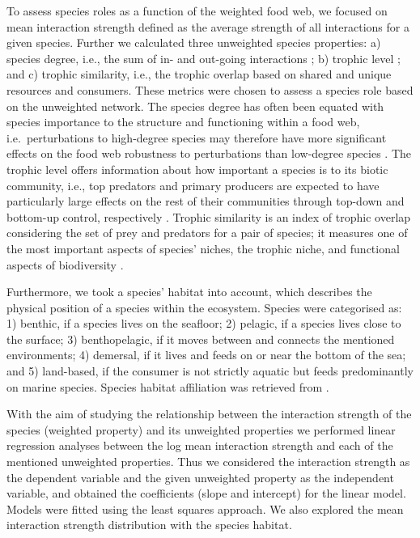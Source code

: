 \documentclass[gc, manuscript]{copernicus}
\begin{document}
To assess species roles as a function of the weighted food web, we
focused on mean interaction strength defined as the average strength of
all interactions for a given species. Further we calculated three
unweighted species properties: a) species degree, i.e., the sum of in-
and out-going interactions ; b) trophic level ; and c) trophic
similarity, i.e., the trophic overlap based on shared and unique
resources and consumers. These metrics were chosen to assess a species
role based on the unweighted network. The species degree has often been
equated with species importance to the structure and functioning within
a food web, i.e.~perturbations to high-degree species may therefore have
more significant effects on the food web robustness to perturbations
than low-degree species
\citetext{\citealp{Dunne2002a}; \citealp[references
in][]{Cirtwill2018a}}. The trophic level offers information about how
important a species is to its biotic community, i.e., top predators and
primary producers are expected to have particularly large effects on the
rest of their communities through top-down and bottom-up control,
respectively \citep[references in][]{Cirtwill2018a}. Trophic similarity
is an index of trophic overlap considering the set of prey and predators
for a pair of species; it measures one of the most important aspects of
species' niches, the trophic niche, and functional aspects of
biodiversity \citep{Martinez1991, Williams2000}.

Furthermore, we took a species' habitat into account, which describes
the physical position of a species within the ecosystem. Species were
categorised as: 1) benthic, if a species lives on the seafloor; 2)
pelagic, if a species lives close to the surface; 3) benthopelagic, if
it moves between and connects the mentioned environments; 4) demersal,
if it lives and feeds on or near the bottom of the sea; and 5)
land-based, if the consumer is not strictly aquatic but feeds
predominantly on marine species. Species habitat affiliation was
retrieved from \citet{Jacob2011}.

With the aim of studying the relationship between the interaction
strength of the species (weighted property) and its unweighted
properties we performed linear regression analyses between the log mean
interaction strength and each of the mentioned unweighted properties.
Thus we considered the interaction strength as the dependent variable
and the given unweighted property as the independent variable, and
obtained the coefficients (slope and intercept) for the linear model.
Models were fitted using the least squares approach. We also explored
the mean interaction strength distribution with the species habitat.
\end{document}
